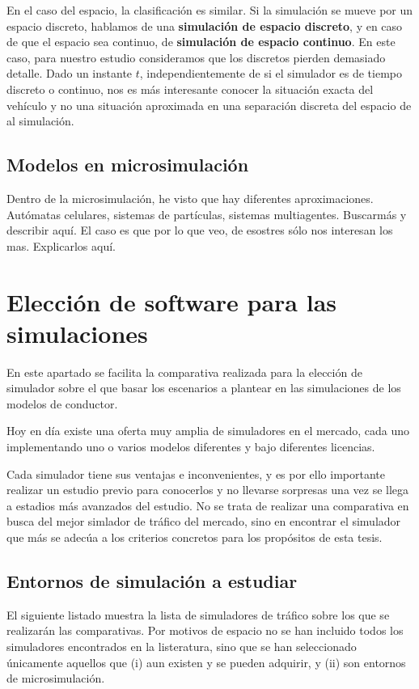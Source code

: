 En el caso del espacio, la clasificación es similar. Si la simulación se mueve por un espacio discreto, hablamos de una \textbf{simulación de espacio discreto}, y en caso de que el espacio sea continuo, de \textbf{simulación de espacio continuo}. En este caso, para nuestro estudio consideramos que los discretos pierden demasiado detalle. Dado un instante $t$, independientemente de si el simulador es de tiempo discreto o continuo, nos es más interesante conocer la situación exacta del vehículo y no una situación aproximada en una separación discreta del espacio de al simulación.

\subsection{Modelos en microsimulación}

Dentro de la microsimulación, he visto que hay diferentes aproximaciones. Autómatas celulares, sistemas de partículas, sistemas multiagentes. Buscarmás y describir aquí. El caso es que por lo que veo, de esostres sólo nos interesan los mas. Explicarlos aquí.


\section{Elección de software para las simulaciones}

En este apartado se facilita la comparativa realizada para la elección de simulador sobre el que basar los escenarios a plantear en las simulaciones de los modelos de conductor.

Hoy en día existe una oferta muy amplia de simuladores en el mercado, cada uno implementando uno o varios modelos diferentes y bajo diferentes licencias.

Cada simulador tiene sus ventajas e inconvenientes, y es por ello importante realizar un estudio previo para conocerlos y no llevarse sorpresas una vez se llega a estadios más avanzados del estudio. No se trata de realizar una comparativa en busca del mejor simlador de tráfico del mercado, sino en encontrar el simulador que más se adecúa a los criterios concretos para los propósitos de esta tesis.

\subsection{Entornos de simulación a estudiar}

El siguiente listado muestra la lista de simuladores de tráfico sobre los que se realizarán las comparativas. Por motivos de espacio no se han incluido todos los simuladores encontrados en la listeratura, sino que se han seleccionado únicamente aquellos que (i) aun existen y se pueden adquirir, y (ii) son entornos de microsimulación.

